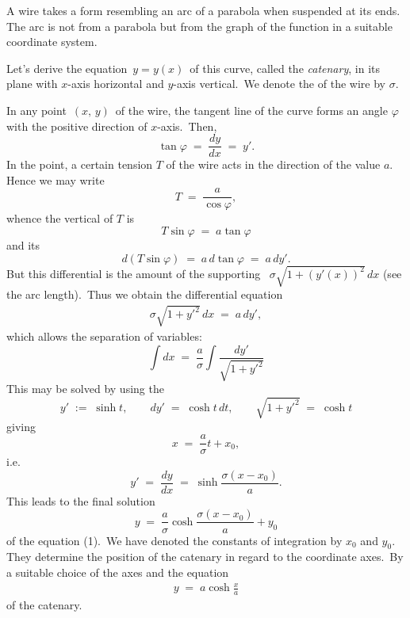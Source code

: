 \documentclass[12pt]{article}
\theoremstyle{definition}
\begin{document}
A  wire takes a form resembling an arc of a parabola when suspended at its ends.\, The arc is not from a parabola but from the graph of the  function in a suitable coordinate system.

Let's derive the equation \,$y = y(x)$\, of this curve, called the {\em catenary}, in its plane with $x$-axis horizontal and $y$-axis vertical.\, We denote the  of the wire by $\sigma$.

In any point \,$(x,\,y)$\, of the wire, the tangent line of the curve forms an angle $\varphi$ with the positive direction of $x$-axis.\, Then,
             $$\tan\varphi \;=\; \frac{dy}{dx} \;=\; y'.$$
In the point, a certain tension $T$ of the wire acts in the direction of the  value $a$.\, Hence we may write
              $$T \;=\; \frac{a}{\cos\varphi},$$
whence the vertical  of $T$ is
          $$T\sin{\varphi} \;=\; a\tan{\varphi}$$
and its 
      $$d(T\sin{\varphi}) \;=\; a\,d\tan{\varphi} \;=\; a\,dy'.$$
But this differential is the amount of the supporting \, $\sigma\sqrt{1+(y'(x))^2}\,dx$ (see the arc length).\, Thus we obtain the differential equation
\begin{align}
\sigma\sqrt{1\!+\!y'^2}\,dx \;=\; a\,dy',
\end{align}
which allows the separation of variables:
$$\int dx \;=\; \frac{a}{\sigma}\int\frac{dy'}{\sqrt{1\!+\!y'^2}}$$
This may be solved by using the 
$$y' \;:=\; \sinh{t}, \qquad dy' \;=\; \cosh{t}\,dt, \qquad \sqrt{1\!+\!y'^2} \;=\; \cosh{t}$$
giving
$$x \;=\; \frac{a}{\sigma}t+x_0,$$
i.e.
$$y' \;=\; \frac{dy}{dx} \;=\; \sinh\frac{\sigma(x\!-\!x_0)}{a}.$$
This leads to the final solution
$$y \;=\; \frac{a}{\sigma}\cosh\frac{\sigma(x\!-\!x_0)}{a}+y_0$$
of the equation (1).\, We have denoted the constants of integration by $x_0$ and $y_0$.\, They determine the position of the catenary in regard to the coordinate axes.\, By a suitable choice of the axes and the  equation
\begin{align}
y \;=\; a\cosh\frac{x}{a}
\end{align}
of the catenary.
\end{document}
